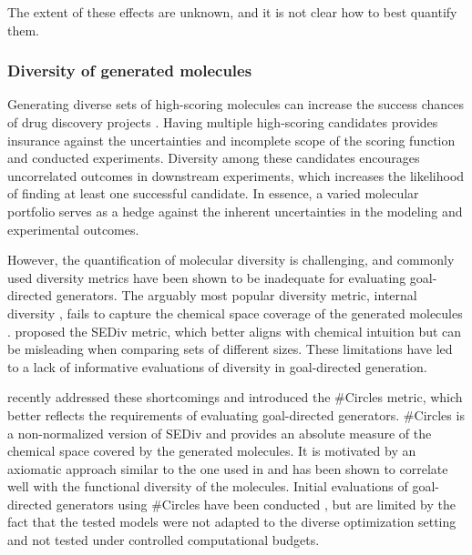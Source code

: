 The extent of these effects are unknown, and it is not clear how to best quantify them.

\subsubsection{Diversity of generated molecules}
Generating diverse sets of high-scoring molecules can increase the success chances of drug discovery
projects \citep{martinDiverseViewpointsComputational2001,gorseDiversityMedicinalChemistry2006}.
Having multiple high-scoring candidates provides insurance against the uncertainties and incomplete
scope of the scoring function and conducted experiments. Diversity among these candidates encourages
uncorrelated outcomes in downstream experiments, which increases the likelihood of finding at least
one successful candidate. In essence, a varied molecular portfolio serves as a hedge against the
inherent uncertainties in the modeling and experimental outcomes.

However, the quantification of molecular diversity is challenging, and commonly used diversity
metrics have been shown to be inadequate for evaluating goal-directed generators. The
arguably most popular diversity metric, internal diversity
\citep{benhendaChemGANChallengeDrug2017}, fails to capture the chemical space coverage
of the generated molecules
\citep{waldmanNovelAlgorithmsOptimization2000,xieHowMuchSpace2023,thomasComparisonStructureLigandbased2021}.
\citet{thomasComparisonStructureLigandbased2021} proposed the \ac{SEDiv} metric, which better aligns
with chemical intuition but can be misleading when comparing sets of different sizes. These
limitations have led to a lack of informative evaluations of diversity in goal-directed generation.

\citet{xieHowMuchSpace2023} recently addressed these shortcomings and introduced the \#Circles
metric, which better reflects the requirements of evaluating goal-directed generators. \#Circles is
a non-normalized version of \ac{SEDiv} and provides an absolute measure of the chemical space
covered by the generated molecules. It is motivated by an axiomatic approach similar to the one used
in \citep{waldmanNovelAlgorithmsOptimization2000} and has been shown to correlate well with the
functional diversity of the molecules. Initial evaluations of goal-directed generators
using \#Circles have been conducted \citep{xieHowMuchSpace2023}, but are limited by the fact that the tested models were not
adapted to the diverse optimization setting and not tested under controlled computational budgets.

